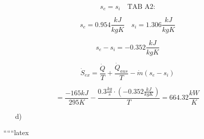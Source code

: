 \[
s_e = s_i \quad \text{TAB A2:}
\]

\[
s_e = 0.954 \frac{kJ}{kgK} \quad s_i = 1.306 \frac{kJ}{kgK}
\]

\[
s_e - s_i = -0.352 \frac{kJ}{kgK}
\]

\[
\dot{S}_{ex} = \frac{\dot{Q}}{T} + \frac{\dot{Q}_{aus}}{T} - \dot{m}(s_e - s_i)
\]

\[
= \frac{-165kJ}{295K} - \frac{0.3 \frac{kg}{s} \cdot (-0.352 \frac{kJ}{kgK})}{T} = 664.32 \frac{kW}{K}
\]

\underline{\hspace{2cm}}

\begin{itemize}
    \item[d)]
\end{itemize}

``````latex


